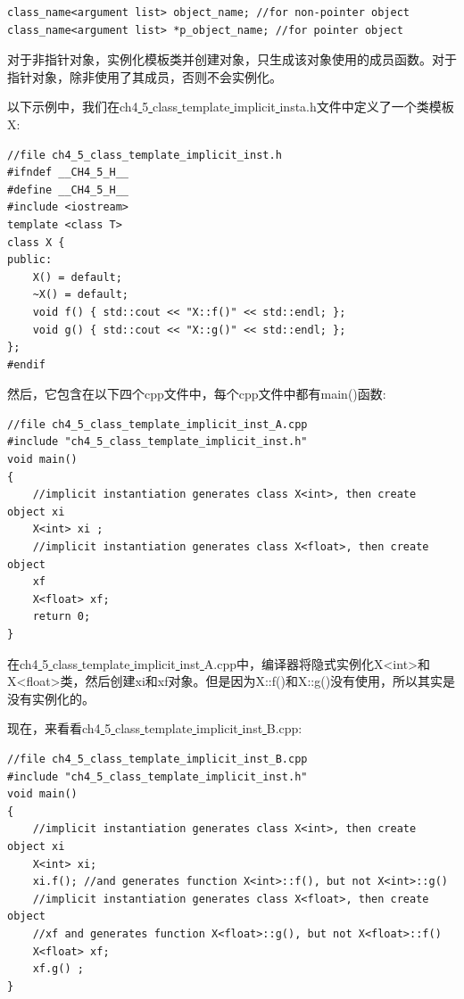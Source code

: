 \begin{lstlisting}[caption={}]
class_name<argument list> object_name; //for non-pointer object
class_name<argument list> *p_object_name; //for pointer object
\end{lstlisting}

对于非指针对象，实例化模板类并创建对象，只生成该对象使用的成员函数。对于指针对象，除非使用了其成员，否则不会实例化。 \par
以下示例中，我们在ch4\underline{ }5\underline{ }class\underline{ }template\underline{ }implicit\underline{ }insta.h文件中定义了一个类模板X:\par

\begin{lstlisting}[caption={}]
//file ch4_5_class_template_implicit_inst.h
#ifndef __CH4_5_H__
#define __CH4_5_H__
#include <iostream>
template <class T>
class X {
public:
	X() = default;
	~X() = default;
	void f() { std::cout << "X::f()" << std::endl; };
	void g() { std::cout << "X::g()" << std::endl; };
};
#endif
\end{lstlisting}

然后，它包含在以下四个cpp文件中，每个cpp文件中都有main()函数: \par

\begin{lstlisting}[caption={}]
//file ch4_5_class_template_implicit_inst_A.cpp
#include "ch4_5_class_template_implicit_inst.h"
void main()
{
	//implicit instantiation generates class X<int>, then create object xi
	X<int> xi ;
	//implicit instantiation generates class X<float>, then create object
	xf
	X<float> xf;
	return 0;
}
\end{lstlisting}

在ch4\underline{ }5\underline{ }class\underline{ }template\underline{ }implicit\underline{ }inst\underline{ }A.cpp中，编译器将隐式实例化X<int>和X<float>类，然后创建xi和xf对象。但是因为X::f()和X::g()没有使用，所以其实是没有实例化的。 \par
现在，来看看ch4\underline{ }5\underline{ }class\underline{ }template\underline{ }implicit\underline{ }inst\underline{ }B.cpp: \par

\begin{lstlisting}[caption={}]
//file ch4_5_class_template_implicit_inst_B.cpp
#include "ch4_5_class_template_implicit_inst.h"
void main()
{
	//implicit instantiation generates class X<int>, then create object xi
	X<int> xi;
	xi.f(); //and generates function X<int>::f(), but not X<int>::g()
	//implicit instantiation generates class X<float>, then create object
	//xf and generates function X<float>::g(), but not X<float>::f()
	X<float> xf;
	xf.g() ;
}
\end{lstlisting}

